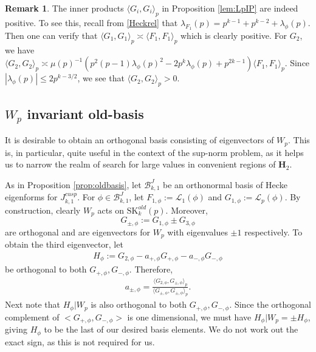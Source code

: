 \documentclass[11pt]{amsart}
\numberwithin{equation}{section}
\theoremstyle{plain}
\theoremstyle{definition}
\newtheorem{rmk}[thm]{Remark}
\newcommand{\htwo}{\mf H_2}
\newcommand{\mf}{\mathbf}
\newcommand{\mc}{\mathcal}
\newcommand{\mrm}{\mathrm}
\newcommand{\lan}{\langle }
\newcommand{\ran}{\rangle}
\newcommand{\skk}{\mrm{SK}_k}
\begin{document}
\begin{rmk}
   The inner products $\lan G_i, G_i\ran_p$ in Proposition \ref{lem:LpIP} are indeed positive. To see this, recall from \eqref{Heckrel} that $\lambda_{F_1}(p)= p^{k-1}+p^{k-2}+\lambda_\phi(p)$. Then one can verify that $\lan G_1, G_1\ran_p\asymp \lan F_1, F_1\ran_p$ which is clearly positive. For $G_2$, we have $\lan G_2, G_2\ran_p\asymp \mu(p)^{-1}(p^2(p-1)\lambda_\phi(p)^2- 2p^{k}\lambda_\phi(p)+p^{2k-1} )\lan F_1, F_1\ran_p $. Since $|\lambda_\phi(p)|\le 2 p^{k-3/2}$, we see that $\lan G_2, G_2\ran_p>0$.
\end{rmk}

\subsection{\texorpdfstring{$W_p$}{Wp} invariant old-basis} \label{wp-inv}
It is desirable to obtain an orthogonal basis consisting of eigenvectors of $W_p$. This is, in particular, quite useful in the context of the sup-norm problem, as it helps us to narrow the realm of search for large values in convenient regions of $\htwo$. 

As in Proposition \ref{prop:oldbasis}, let $\mc B_{k,1}^J$ be an orthonormal basis of Hecke eigenforms for $J_{k,1}^{cusp}$. For $\phi\in \mc B_{k,1}^J$, let $F_{1,\phi}:=\mc L_1(\phi)$ and $G_{1,\phi}:=\mc L_p(\phi)$. By construction, clearly $W_p$ acts on $\skk^{old}(p)$. Moreover, 
\begin{equation} \label{g-phi}
    G_{\pm, \phi}:=G_{1,\phi}  \pm G_{3,\phi}
\end{equation}
are orthogonal and are eigenvectors for $W_p$ with eigenvalues $\pm 1$ respectively. To obtain the third eigenvector, let 
\begin{align} \label{h-phi}
H_\phi:= G_{2,\phi} - a_{+, \phi} G_{+, \phi} - a_{-, \phi} G_{-, \phi}
\end{align}
be orthogonal to both $G_{+, \phi}, G_{-, \phi}$. Therefore,
\begin{align}\label{apm}
    a_{\pm, \phi} = \frac{\lan G_{2, \phi}, G_{\pm, \phi} \ran_p }{\lan  G_{\pm, \phi}, G_{\pm, \phi} \ran_p }.
\end{align}
Next note that $H_\phi |W_p$ is also orthogonal to both $G_{+, \phi}, G_{-, \phi}$. Since the orthogonal complement of $<G_{+, \phi}, G_{-, \phi}  >$ is one dimensional, we must have $H_\phi|W_p = \pm H_\phi$, giving $H_\phi$ to be the last of our desired basis elements. We do not work out the exact sign, as this is not required for us.
\end{document}
